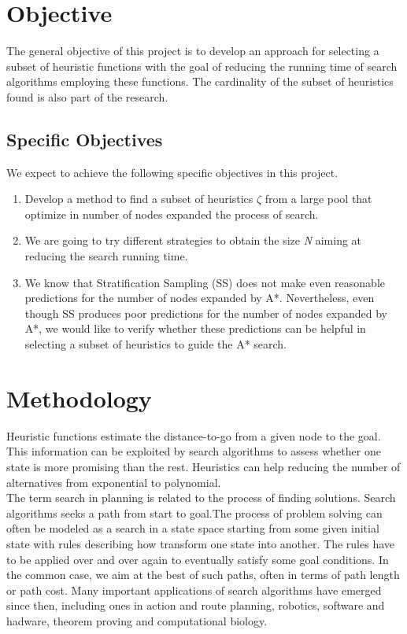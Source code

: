 \documentclass[a4paper,12pt]{article}
\begin{document}
\section{Objective}

The general objective of this project is to develop an approach for selecting a subset of heuristic functions with the goal of reducing the running time of search algorithms employing these functions. The cardinality of the subset of heuristics found is also part of the research.

\subsection{Specific Objectives}
We expect to achieve the following specific objectives in this project.
\begin{enumerate}
\item Develop a method to find a subset of heuristics $\zeta$ from a large pool that optimize in number of nodes expanded the process of search.
\item We are going to try different strategies to obtain the size \textit{N} aiming at reducing the search running time.
\item We know that Stratification Sampling (SS) does not make even reasonable predictions for the number of nodes expanded by A*. Nevertheless, even though SS produces poor predictions for the number of nodes expanded by A*, we would like to verify whether these predictions can be helpful in selecting a subset of heuristics to guide the A* search.
\end{enumerate}

\section{Methodology}
Heuristic functions estimate the distance-to-go from a given node to the goal. This information can be exploited by search algorithms to assess whether one state is more promising than the rest. Heuristics can help reducing the number of alternatives from exponential to polynomial.\\

The term search in planning is related to the process of finding solutions.       
Search algorithms seeks a path from start to goal.The process of problem solving can often be modeled as a search in a state space starting from some given initial state with rules describing how transform one state into another. The rules have to be applied over and over again to eventually satisfy some goal conditions. In the common case, we aim at the best of such paths, often in terms of path length or path cost. Many important applications of search algorithms have emerged since then, including ones in action and route planning, robotics, software and hadware, theorem proving and computational biology.\\
\end{document}
